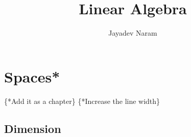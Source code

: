 \documentclass[10pt,a4paper]{article}
\author{Jayadev Naram}
\title{Linear Algebra}
\begin{document}
\maketitle 

\maketitle
 
\tableofcontents

\newpage
  
\newtheorem{theorem}{Theorem}
\newtheorem{corollary}{Corollary}[theorem]
\newtheorem{lemma}[theorem]{Lemma}
\newtheorem{mydef}{Definition}
\newtheorem{remark}{Remark}
\newtheorem{note}{Note}
\newtheorem{prop}{Proposition}

\newcommand{\highlight}[1]{\underline{\textbf{#1}}}
\newcommand{\Field}[1]{\mathbb{#1}}


\section{Spaces*}

\{*Add it as a chapter\}
\{*Increase the line width\}

\subsection{Dimension}\label{sec:dimension}
\end{document}
